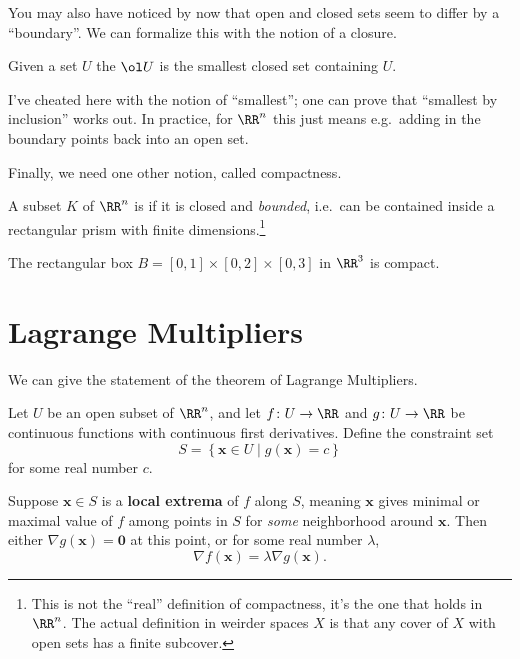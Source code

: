 \documentclass[11pt]{scrartcl}
\begin{document}
You may also have noticed by now that open and closed sets seem to differ
by a ``boundary''. We can formalize this with the notion of a closure.
\begin{definition}
  Given a set $U$ the  $\ol U$ is the smallest closed set containing $U$.
\end{definition}
I've cheated here with the notion of ``smallest'';
one can prove that ``smallest by inclusion'' works out.
In practice, for $\RR^n$ this just means {e.g.}\
adding in the boundary points back into an open set.


Finally, we need one other notion, called compactness.
\begin{definition}
  A subset $K$ of $\RR^n$ is 
  if it is closed and \emph{bounded},
  i.e.\ can be contained inside a rectangular prism
  with finite dimensions.\footnote{This
    is not the ``real'' definition of compactness,
    it's the one that holds in $\RR^n$.
    The actual definition in weirder spaces $X$ is that
    any cover of $X$ with open sets has a finite subcover.}
\end{definition}

\begin{example}
  The rectangular box
  $B = [0,1] \times [0,2] \times [0,3]$ in $\RR^3$
  is compact.
\end{example}

\section{Lagrange Multipliers}
We can give the statement of the theorem of Lagrange Multipliers.

\begin{theorem}
  Let $U$ be an open subset of $\RR^n$,
  and let $f \colon U \to \RR$
  and $g \colon U \to \RR$ be continuous functions
  with continuous first derivatives.
  Define the constraint set
  \[ S = \left\{ \mathbf x \in U \mid g(\mathbf x) = c \right\} \]
  for some real number $c$.

  Suppose $\mathbf x \in S$ is a
  \textbf{local extrema} of $f$ along $S$,
  meaning $\mathbf x$ gives minimal or maximal value
  of $f$ among points in $S$ for \emph{some} neighborhood around $\mathbf x$.
  Then either $\nabla g(\mathbf x) = \mathbf 0$ at this point,
  or for some real number $\lambda$,
  \[ \nabla f(\mathbf x) = \lambda \nabla g(\mathbf x). \]
\end{theorem}
\end{document}
